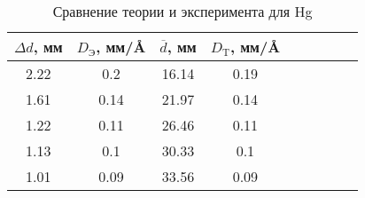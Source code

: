 \begin{table}[h!]
	\caption{Сравнение теории и эксперимента для Hg}
		\begin{center}
			\begin{tabular}{|c|c|c|c|c|c|c|c|c|}
				\hline
				$ \Delta d $, мм & $ D_{\text{Э}} $, мм/\AA & 	$ \overline{d} $, мм & $ D_{\text{T}} $, мм/\AA     \\
				\hline
         2.22 & 0.2 & 16.14 & 0.19 \\
			   1.61 & 0.14 & 21.97 & 0.14 \\
			   1.22 & 0.11 & 26.46 & 0.11 \\
			   1.13 & 0.1 & 30.33 & 0.1 \\
			   1.01 & 0.09 & 33.56 & 0.09 \\
				\hline
			\end{tabular}
		\end{center}
		\label{}
	\end{table}